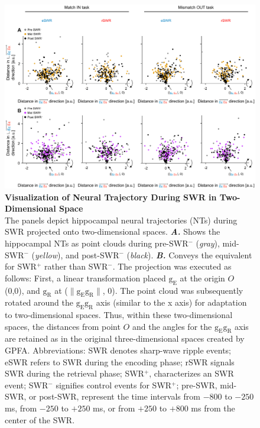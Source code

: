 \documentclass[preprint,review,12pt]{elsarticle}%
\begin{document}
        \begin{figure}[ht]
        	\centering
            \includegraphics[width=1\textwidth]{./src/figures/.png/Figure_ID_06.png}
        	\caption{\textbf{
Visualization of Neural Trajectory During SWR in Two-Dimensional Space
}
\smallskip
\\
The panels depict hippocampal neural trajectories (NTs) during SWR projected onto two-dimensional spaces. \textbf{\textit{A.}} Shows the hippocampal NTs as point clouds during pre-SWR$^-$ (\textit{gray}), mid-SWR$^-$ (\textit{yellow}), and post-SWR$^-$ (\textit{black}). \textbf{\textit{B.}} Conveys the equivalent for SWR$^+$ rather than SWR$^-$. The projection was executed as follows: First, a linear transformation placed $\mathrm{g_{E}}$ at the origin $O$ (0,0), and $\mathrm{g_{R}}$ at ($\lVert \mathrm{g_{E}g_{R}} \rVert$, 0). The point cloud was subsequently rotated around the $\mathrm{g_{E}g_{R}}$ axis (similar to the x axis) for adaptation to two-dimensional spaces. Thus, within these two-dimensional spaces, the distances from point $O$ and the angles for the $\mathrm{g_{E}g_{R}}$ axis are retained as in the original three-dimensional spaces created by GPFA. Abbreviations: SWR denotes sharp-wave ripple events; eSWR refers to SWR during the encoding phase; rSWR signals SWR during the retrieval phase; SWR$^+$, characterizes an SWR event; SWR$^-$ signifies control events for SWR$^+$; pre-SWR, mid-SWR, or post-SWR, represent the time intervals from $-800$ to $-250$ ms, from $-250$ to $+250$ ms, or from $+250$ to $+800$ ms from the center of the SWR.
}
        	\label{fig:06}
        \end{figure}
\end{document}

